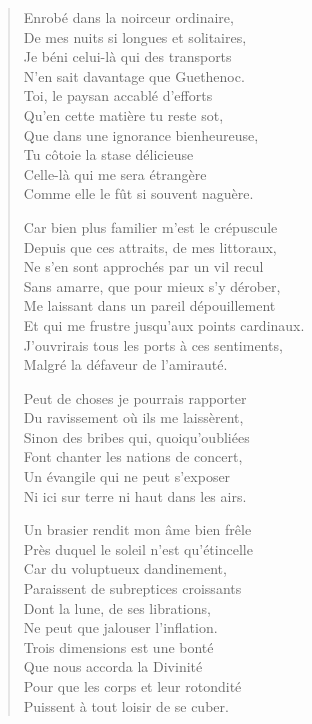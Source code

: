 \begin{verse}
Enrobé dans la noirceur ordinaire,\\
De mes nuits si longues et solitaires,\\
Je béni celui-là qui des transports\\
N’en sait davantage que Guethenoc.\\
Toi, le paysan accablé d’efforts\\
Qu’en cette matière tu reste sot,\\
Que dans une ignorance bienheureuse,\\
Tu côtoie la stase délicieuse\\
Celle-là qui me sera étrangère\\
Comme elle le fût si souvent naguère.

Car bien plus familier m’est le crépuscule\\
Depuis que ces attraits, de mes littoraux,\\
Ne s’en sont approchés par un vil recul\\
Sans amarre, que pour mieux s’y dérober,\\
Me laissant dans un pareil dépouillement\\
Et qui me frustre jusqu’aux points cardinaux.\\
J’ouvrirais tous les ports à ces sentiments,\\
Malgré la défaveur de l’amirauté. 

Peut de choses je pourrais rapporter\\
Du ravissement où ils me laissèrent,\\
Sinon des bribes qui, quoiqu’oubliées\\
Font chanter les nations de concert,\\
Un évangile qui ne peut s’exposer\\
Ni ici sur terre ni haut dans les airs. 

Un brasier rendit mon âme bien frêle\\
Près duquel le soleil n’est qu’étincelle\\
Car du voluptueux dandinement,\\
Paraissent de subreptices croissants\\
Dont la lune, de ses librations,\\
Ne peut que jalouser l’inflation.\\
Trois dimensions est une bonté\\
Que nous accorda la Divinité\\
Pour que les corps et leur rotondité\\
Puissent à tout loisir de se cuber. %


\end{verse}
